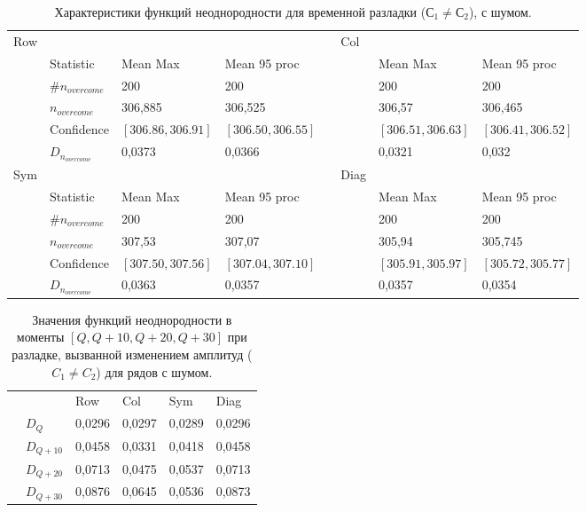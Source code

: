 \documentclass[specialist, substylefile = spbu.rtx,
			   subf, href, 12pt]{disser}
\begin{document}
\newpage
\begin{table}[!hhh]
	\center
	\small
	\caption{Характеристики функций неоднородности для временной разладки ($С_1 \neq С_2$), с шумом.}
	\begin{tabular}{llllllll}
		Row & 				   & 		  	  & 			 && Col & 		      & 			      \\
		& Statistic        & Mean Max 	  & Mean 95 proc && 	& Mean Max     & Mean 95 proc     \\
		& $\#n_{overcome}$ & 200 	  	  & 200 		 &&     & 200 	      & 200 			  \\
		& $n_{overcome}$   & 306,885   	  & 306,525      &&     & 306,57       & 306,465 		  \\
		& Confidence       & $[306.86, 306.91]$& $[306.50, 306.55]$&&     & $[306.51, 306.63]$ & $[306.41, 306.52]$     \\
		&$D_{n_{overcome}}$& 0,0373		  &	0,0366		 &&     & 0,0321  &   0,032          \\
		Sym & 				   & 		  	  & 			 && Diag& 		      & 			      \\
		& Statistic        & Mean Max 	  & Mean 95 proc && 	& Mean Max     & Mean 95 proc     \\
		& $\#n_{overcome}$ & 200 	  	  & 200 		 &&     & 200 	      & 200 			  \\
		& $n_{overcome}$   & 307,53   	  & 307,07      &&     & 305,94      & 305,745 		  \\
		& Confidence       & $[307.50, 307.56]$ & $[307.04, 307.10]$ &&     & $[305.91, 305.97]$ & $[305.72, 305.77]$     \\
		&$D_{n_{overcome}}$& 0,0363		  &	0,0357		 &&     & 0,0357		 &0,0354          \\
	\end{tabular}
	\label{tab:TemporaryHeterogeneityNoisedAmplitude}
\end{table}

\begin{table}[!hhh]
		\center
		\caption{Значения функций неоднородности в моменты $[Q, Q+10, Q+20, Q+30]$ при разладке, вызванной изменением амплитуд ($ C_1 \neq C_2 $) для рядов с шумом.}
	\begin{tabular}{llllll}
		&              & Row 	  & Col 	& Sym    & Diag  \\
		& $D_Q$        & 0,0296	  & 0,0297 	& 0,0289 & 0,0296		\\
		& $D_{Q+10}$   & 0,0458   & 0,0331  & 0,0418 & 0,0458	\\
		& $D_{Q+20}$   & 0,0713   & 0,0475  & 0,0537 & 0,0713	\\
		& $D_{Q+30}$   & 0,0876	  &	0,0645	& 0,0536 & 0,0873	
	\end{tabular}
	\label{tab:TemporaryHeterogeneityNoisedAmplitudeValues}
\end{table}
\end{document}
